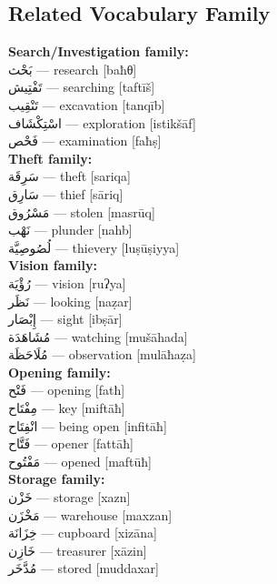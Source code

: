 \documentclass[letterpaper,12pt]{article}
\begin{document}
\subsection{Related Vocabulary Family}
\begin{multicols}{2}

\textbf{Search/Investigation family:}\\
\textarabic{بَحْث} — research [baħθ]\\
\textarabic{تَفْتِيش} — searching [taftīš]\\
\textarabic{تَنْقِيب} — excavation [tanqīb]\\
\textarabic{اسْتِكْشَاف} — exploration [istikšāf]\\
\textarabic{فَحْص} — examination [faħṣ]\\

\textbf{Theft family:}\\
\textarabic{سَرِقَة} — theft [sariqa]\\
\textarabic{سَارِق} — thief [sāriq]\\
\textarabic{مَسْرُوق} — stolen [masrūq]\\
\textarabic{نَهْب} — plunder [nahb]\\
\textarabic{لُصُوصِيَّة} — thievery [luṣūṣiyya]\\

\textbf{Vision family:}\\
\textarabic{رُؤْيَة} — vision [ruʔya]\\
\textarabic{نَظَر} — looking [naẓar]\\
\textarabic{إِبْصَار} — sight [ibṣār]\\
\textarabic{مُشَاهَدَة} — watching [mušāhada]\\
\textarabic{مُلَاحَظَة} — observation [mulāħaẓa]\\

\textbf{Opening family:}\\
\textarabic{فَتْح} — opening [fatħ]\\
\textarabic{مِفْتَاح} — key [miftāħ]\\
\textarabic{انْفِتَاح} — being open [infitāħ]\\
\textarabic{فَتَّاح} — opener [fattāħ]\\
\textarabic{مَفْتُوح} — opened [maftūħ]\\

\textbf{Storage family:}\\
\textarabic{خَزْن} — storage [xazn]\\
\textarabic{مَخْزَن} — warehouse [maxzan]\\
\textarabic{خِزَانَة} — cupboard [xizāna]\\
\textarabic{خَازِن} — treasurer [xāzin]\\
\textarabic{مُدَّخَر} — stored [muddaxar]\\


\end{multicols}
\end{document}
